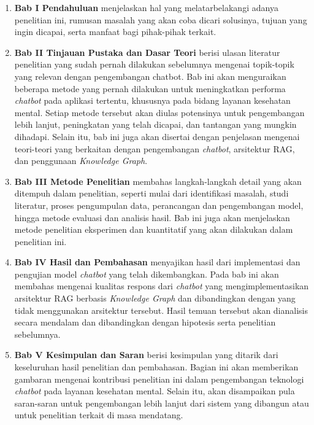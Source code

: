 \begin{enumerate}
	\item \textbf{Bab I Pendahuluan} menjelaskan hal yang melatarbelakangi adanya penelitian ini, rumusan masalah yang akan coba dicari solusinya, tujuan yang ingin dicapai, serta manfaat bagi pihak-pihak terkait.
	\item \textbf{Bab II Tinjauan Pustaka dan Dasar Teori} berisi ulasan literatur penelitian yang sudah pernah dilakukan sebelumnya mengenai topik-topik yang relevan dengan pengembangan chatbot.
	      Bab ini akan menguraikan beberapa metode yang pernah dilakukan untuk meningkatkan performa \textit{chatbot} pada aplikasi tertentu, khususnya pada bidang layanan kesehatan mental.
	      Setiap metode tersebut akan diulas potensinya untuk pengembangan lebih lanjut, peningkatan yang telah dicapai, dan tantangan yang mungkin dihadapi.
	      Selain itu, bab ini juga akan disertai dengan penjelasan mengenai teori-teori yang berkaitan dengan pengembangan \textit{chatbot}, arsitektur RAG, dan penggunaan \textit{Knowledge Graph}.
	\item \textbf{Bab III Metode Penelitian} membahas langkah-langkah detail yang akan ditempuh dalam penelitian, seperti mulai dari identifikasi masalah, studi literatur, proses pengumpulan data, perancangan dan pengembangan model, hingga metode evaluasi dan analisis hasil.
	      Bab ini juga akan menjelaskan metode penelitian eksperimen dan kuantitatif yang akan dilakukan dalam penelitian ini.
	\item \textbf{Bab IV Hasil dan Pembahasan} menyajikan hasil dari implementasi dan pengujian model \textit{chatbot} yang telah dikembangkan.
	      Pada bab ini akan membahas mengenai kualitas respons dari \textit{chatbot} yang mengimplementasikan arsitektur RAG berbasis \textit{Knowledge Graph} dan dibandingkan dengan yang tidak menggunakan arsitektur tersebut.
	      Hasil temuan tersebut akan dianalisis secara mendalam dan dibandingkan dengan hipotesis serta penelitian sebelumnya.
	\item \textbf{Bab V Kesimpulan dan Saran}  berisi kesimpulan yang ditarik dari keseluruhan hasil penelitian dan pembahasan.
	      Bagian ini akan memberikan gambaran mengenai kontribusi penelitian ini dalam pengembangan teknologi \textit{chatbot} pada layanan kesehatan mental.
	      Selain itu, akan disampaikan pula saran-saran untuk pengembangan lebih lanjut dari sistem yang dibangun atau untuk penelitian terkait di masa mendatang.
\end{enumerate}